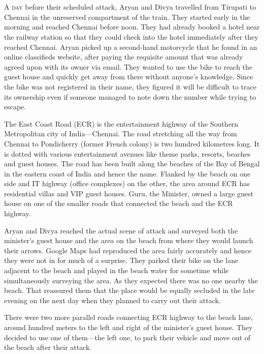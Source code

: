 \chapter{}

\lettrine{A}{ day} before their scheduled attack, Aryan and Divya travelled from Tirupati to
Chennai in the unreserved compartment of the train. They started early in the
morning and reached Chennai before noon. They had already booked a hotel near
the railway station so that they could check into the hotel immediately after
they reached Chennai. Aryan picked up a second-hand motorcycle that he found in
an online classifieds website, after paying the requisite amount that was
already agreed upon with its owner via email. They wanted to use the bike to
reach the guest house and quickly get away from there without anyone's
knowledge. Since the bike was not registered in their name, they figured it will
be difficult to trace its ownership even if someone managed to note down the
number while trying to escape.

The East Coast Road (ECR) is the entertainment highway of the Southern
Metropolitan city of India—Chennai. The road stretching all the way from
Chennai to Pondicherry (former French colony) is two hundred kilometres long. It
is dotted with various entertainment avenues like theme parks, resorts, beaches
and guest houses. The road has been built along the beaches of the Bay of Bengal
in the eastern coast of India and hence the name. Flanked by the beach on one
side and IT highway (office complexes) on the other, the area around ECR has
residential villas and VIP guest houses. Guru, the Minister, owned a large guest
house on one of the smaller roads that connected the beach and the ECR highway.

Aryan and Divya reached the actual scene of attack and surveyed both the
minister's guest house and the area on the beach from where they would launch
their arrows. Google Maps had reproduced the area fairly accurately and hence
they were not in for much of a surprise. They parked their bike on the lane
adjacent to the beach and played in the beach water for sometime while
simultaneously surveying the area. As they expected there was no one nearby the
beach. That reassured them that the place would be equally secluded in the late
evening on the next day when they planned to carry out their attack.

There were two more parallel roads connecting ECR highway to the beach lane,
around hundred meters to the left and right of the minister's guest house. They
decided to use one of them—the left one, to park their vehicle and move out of
the beach after their attack.

